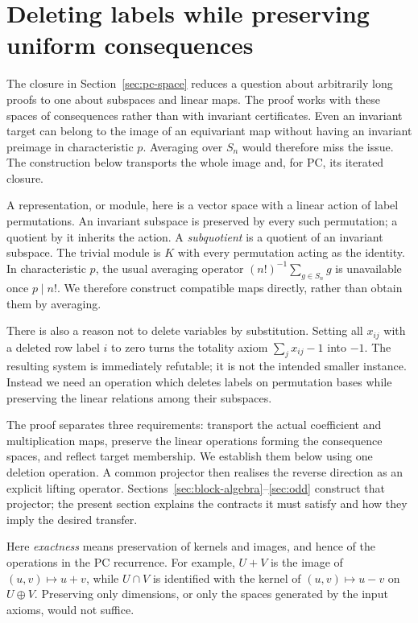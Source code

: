 \documentclass[11pt,a4paper]{article}
\theoremstyle{definition}\newtheorem{definition}[theorem]{Definition}
\theoremstyle{remark}\newtheorem{remark}[theorem]{Remark}
\begin{document}
\section{Deleting labels while preserving uniform consequences}\label{sec:transfer}
The closure in Section~\ref{sec:pc-space} reduces a question about
arbitrarily long proofs to one about subspaces and linear maps. The
proof works with these spaces of consequences rather than with invariant certificates. Even an invariant target can belong to the image of an equivariant map without having an invariant preimage in characteristic $p$. Averaging over $S_n$ would therefore miss the issue. The construction below transports the whole image and, for PC, its iterated closure.

A representation, or module, here is a vector space with a linear action
of label permutations. An invariant subspace is preserved by every
such permutation; a quotient by it inherits the action. A
\emph{subquotient} is a quotient of an invariant subspace. The trivial
module is $K$ with every permutation acting as the identity. In
characteristic $p$, the usual averaging operator
$(n!)^{-1}\sum_{g\in S_n}g$ is unavailable once $p\mid n!$.
We therefore construct compatible maps directly, rather than obtain
them by averaging.

There is also a reason not to delete variables by substitution. Setting
all $x_{ij}$ with a deleted row label $i$ to zero turns the totality axiom
$\sum_jx_{ij}-1$ into $-1$. The resulting system is immediately refutable;
it is not the intended smaller instance. Instead we need an operation
which deletes labels on permutation bases while preserving the linear
relations among their subspaces.

The proof separates three requirements: transport the actual coefficient
and multiplication maps, preserve the linear operations forming the
consequence spaces, and reflect target membership. We establish them
below using one deletion operation. A common projector then realises
the reverse direction as an explicit lifting operator. Sections~\ref{sec:block-algebra}--\ref{sec:odd}
construct that projector; the present section explains the contracts
it must satisfy and how they imply the desired transfer.

Here \emph{exactness} means preservation of kernels and images, and hence
of the operations in the PC recurrence. For example, $U+V$ is the image
of $(u,v)\mapsto u+v$, while $U\cap V$ is identified with the kernel of
$(u,v)\mapsto u-v$ on $U\oplus V$. Preserving only dimensions, or only
the spaces generated by the input axioms, would not suffice.
\end{document}
